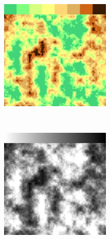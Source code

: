 \begin{figure}
        \centering
        \begin{subfigure}[b]{0.3\textwidth}
                \includegraphics[width=\textwidth]{img/Theory/Perlin_Noise/gradient_discrete.png}
                \label{fig:Fleaf}
        \end{subfigure}%
        ~ %
        \begin{subfigure}[b]{0.3\textwidth}
                \includegraphics[width=\textwidth]{img/Theory/Perlin_Noise/gradient_grey.png}

\end{subfigure}
\end{figure}
